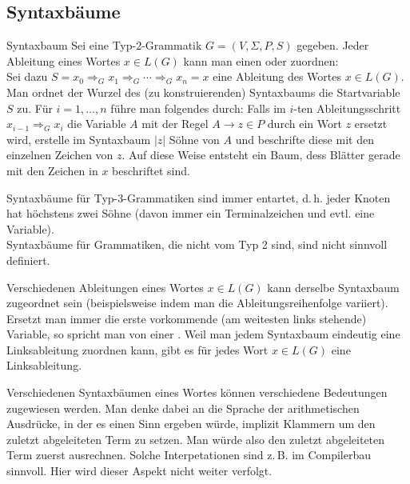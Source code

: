 \pagebreak

\subsection{%
    Syntaxbäume%
}

\begin{Def}{Syntaxbaum}
    Sei eine Typ-2-Grammatik $G = (V, \Sigma, P, S)$ gegeben.
    Jeder Ableitung eines Wortes $x \in L(G)$ kann man einen
     oder  zuordnen:\\
    Sei dazu $S = x_0 \Rightarrow_G x_1 \Rightarrow_G \dotsb
    \Rightarrow_G x_n = x$ eine Ableitung des Wortes $x \in L(G)$.
    Man ordnet der Wurzel des (zu konstruierenden) Syntaxbaums die
    Startvariable $S$ zu.
    Für $i = 1, \dotsc, n$ führe man folgendes durch:
    Falls im $i$-ten Ableitungsschritt $x_{i-1} \Rightarrow_G x_i$
    die Variable $A$ mit der Regel $A \rightarrow z \in P$ durch ein Wort $z$
    ersetzt wird, erstelle im Syntaxbaum $|z|$ Söhne von $A$ und beschrifte
    diese mit den einzelnen Zeichen von $z$.
    Auf diese Weise entsteht ein Baum, dess Blätter gerade mit den Zeichen in
    $x$ beschriftet sind.
\end{Def}

\begin{Bem}
    Syntaxbäume für Typ-3-Grammatiken sind immer entartet, d.\,h.
    jeder Knoten hat höchstens zwei Söhne (davon immer ein Terminalzeichen und
    evtl. eine Variable).\\
    Syntaxbäume für Grammatiken, die nicht vom Typ 2 sind, sind nicht sinnvoll
    definiert.
\end{Bem}

\begin{Bem}
    Verschiedenen Ableitungen eines Wortes $x \in L(G)$ kann derselbe
    Syntaxbaum zugeordnet sein
    (beispielsweise indem man die Ableitungsreihenfolge variiert).
    Ersetzt man immer die erste vorkommende (am weitesten links stehende)
    Variable, so spricht man von einer .
    Weil man jedem Syntaxbaum eindeutig eine Linksableitung zuordnen kann,
    gibt es für jedes Wort $x \in L(G)$ eine Linksableitung.
\end{Bem}

\begin{Bem}
    Verschiedenen Syntaxbäumen eines Wortes können verschiedene Bedeutungen
    zugewiesen werden.
    Man denke dabei an die Sprache der arithmetischen Ausdrücke, in der es
    einen Sinn ergeben würde, implizit Klammern um den zuletzt abgeleiteten
    Term zu setzen.
    Man würde also den zuletzt abgeleiteten Term zuerst ausrechnen.
    Solche Interpetationen sind z.\,B. im Compilerbau sinnvoll.
    Hier wird dieser Aspekt nicht weiter verfolgt.
\end{Bem}


